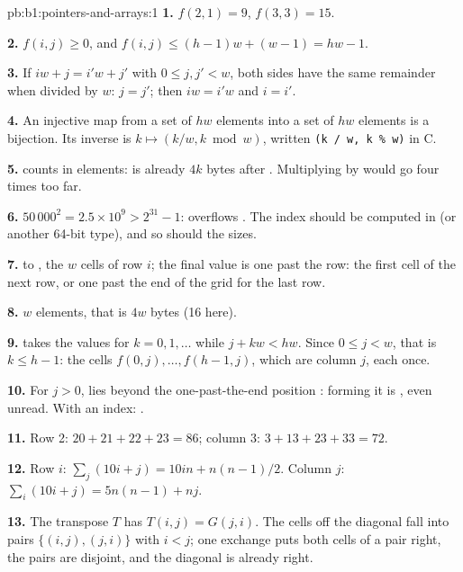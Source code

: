 \begin{solution}{pb:b1:pointers-and-arrays:1}
\textbf{1.} $f(2, 1) = 9$, $f(3, 3) = 15$.

\textbf{2.} $f(i, j) \geq 0$, and $f(i, j) \leq (h - 1)w + (w - 1) = hw - 1$.

\textbf{3.} If $iw + j = i'w + j'$ with $0 \leq j, j' < w$, both sides have the same remainder when divided by $w$:
$j = j'$; then $iw = i'w$ and $i = i'$.

\textbf{4.} An injective map from a set of $hw$ elements into a set of $hw$ elements is a bijection. Its inverse is
$k \mapsto (k / w, k \bmod w)$, written \texttt{(k / w, k \% w)} in C.

\textbf{5.}  counts in elements:  is already $4k$ bytes after . Multiplying by
 would go four times too far.

\textbf{6.} $50\,000^2 = 2.5 \times 10^9 > 2^{31} - 1$:  overflows . The index should be computed
in  (or another 64-bit type), and so should the sizes.

\textbf{7.}  to , the $w$ cells of row $i$; the final value  is
one past the row: the first cell of the next row, or one past the end of the grid for the last row.

\textbf{8.} $w$ elements, that is $4w$ bytes (16 here).

\textbf{9.}  takes the values  for $k = 0, 1, \dots$ while $j + kw < hw$. Since $0 \leq j < w$,
that is $k \leq h - 1$: the cells $f(0, j), \dots, f(h-1, j)$, which are column $j$, each once.

\textbf{10.} For $j > 0$,  lies beyond the one-past-the-end position : forming it is
, even unread. With an index: .

\textbf{11.} Row 2: $20 + 21 + 22 + 23 = 86$; column 3: $3 + 13 + 23 + 33 = 72$.

\textbf{12.} Row $i$: $\sum_j (10i + j) = 10in + n(n-1)/2$. Column $j$: $\sum_i (10i + j) = 5n(n-1) + nj$.

\textbf{13.} The transpose $T$ has $T(i, j) = G(j, i)$. The cells off the diagonal fall into pairs $\{(i, j), (j, i)\}$
with $i < j$; one exchange puts both cells of a pair right, the pairs are disjoint, and the diagonal is already right.


\end{solution}
